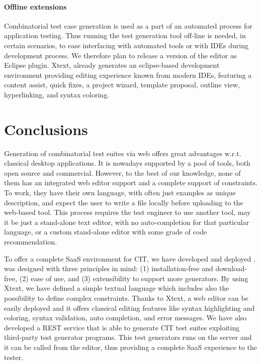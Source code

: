 \begin{tikzborder}{\cite{Gargantini16:validation}}
\begin{tikzborder}{\cite{gargantini_combinatorial_2017}}
\begin{tikzborder}{\cite{garn2019}}
\begin{tikzborder}{\cite{arcaini2019achieving}}
\begin{tikzborder}{\cite{IWCTGargantini2018}}
\paragraph{Offline extensions}
Combinatorial test case generation is used as a part of an automated process for application testing. Thus  running the test generation tool off-line is needed, in certain scenarios, to ease interfacing with automated tools or with IDEs during development process. We therefore plan to release a version of the \ctwedge editor as Eclipse plugin.
Xtext, already generates an eclipse-based development environment providing editing experience known from modern IDEs, featuring a content assist, quick fixes, a project wizard, template proposal, outline view, hyperlinking, and syntax coloring.
\end{tikzborder}

\section{Conclusions} \label{sec:conclusions3}

\begin{tikzborder}{}
Generation of combinatorial test suites via web offers great advantages w.r.t. classical desktop applications. It is nowadays supported by a pool of tools, both open source and commercial. However, to the best of our knowledge, none of them has an integrated web editor support and a complete support of constraints. To work, they have their own language, with often just examples as unique description, and expect the user to write a file locally before uploading to the web-based tool. This process requires the test engineer to use another tool, may it be just a stand-alone text editor, with no auto-completion for that particular language, or a custom stand-alone editor with some grade of code recommendation.

To offer a complete SaaS environment for CIT, we have developed and deployed \ctwedge. 
\ctwedge was designed with three principles in mind: (1) installation-free and download-free, (2) ease of use, and (3) extensibility to support more generators. By using Xtext, we have defined a simple textual language which includes also the possibility to define complex constraints. Thanks to Xtext, a web editor can be easily deployed and it offers classical editing features like syntax highlighting and coloring, syntax validation, auto completion, and error messages. We have also developed a REST service that is able to generate CIT test suites exploiting third-party test generator programs. This test generators runs on the server and it can be called from the editor, thus providing a complete SaaS experience to the tester.
\end{tikzborder}




\end{tikzborder}
\end{tikzborder}
\end{tikzborder}
\end{tikzborder}
